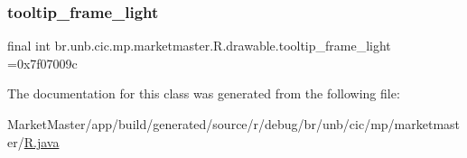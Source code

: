 \mbox{\label{classbr_1_1unb_1_1cic_1_1mp_1_1marketmaster_1_1R_1_1drawable_a44cb8d33e071153577cc8e28f4e4abcf}} 
\subsubsection{\texorpdfstring{tooltip\+\_\+frame\+\_\+light}{tooltip\_frame\_light}}
{\footnotesize\ttfamily final int br.\+unb.\+cic.\+mp.\+marketmaster.\+R.\+drawable.\+tooltip\+\_\+frame\+\_\+light =0x7f07009c\hspace{0.3cm}{\ttfamily [static]}}



The documentation for this class was generated from the following file\+:\begin{DoxyCompactItemize}
\item 
Market\+Master/app/build/generated/source/r/debug/br/unb/cic/mp/marketmaster/\mbox{\hyperlink{debug_2br_2unb_2cic_2mp_2marketmaster_2R_8java}{R.\+java}}\end{DoxyCompactItemize}
